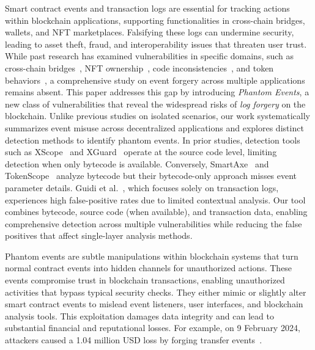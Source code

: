 Smart contract events and transaction logs are essential for tracking actions within blockchain applications, supporting functionalities in cross-chain bridges, wallets, and NFT marketplaces. Falsifying these logs can undermine security, leading to asset theft, fraud, and interoperability issues that threaten user trust. While past research has examined vulnerabilities in specific domains, such as cross-chain bridges~\cite{Xscope,liao2024smartaxe,wang2024xguard}, NFT ownership~\cite{sleepminting}, code inconsistencies~\cite{doccon}, and token behaviors~\cite{TokenScope}, a comprehensive study on event forgery across multiple applications remains absent. This paper addresses this gap by introducing \emph{Phantom Events}, a new class of vulnerabilities that reveal the widespread risks of \emph{log forgery} on the blockchain. Unlike previous studies on isolated scenarios, our work systematically summarizes event misuse across decentralized applications and explores distinct detection methods to identify phantom events. In prior studies, detection tools such as XScope~\cite{Xscope} and XGuard~\cite{wang2024xguard} operate at the source code level, limiting detection when only bytecode is available. Conversely, SmartAxe~\cite{liao2024smartaxe} and TokenScope~\cite{TokenScope} analyze bytecode but their bytecode-only approach misses event parameter details. Guidi et al.~\cite{sleepminting}, which focuses solely on transaction logs, experiences high false-positive rates due to limited contextual analysis. Our tool combines bytecode, source code (when available), and transaction data, enabling comprehensive detection across multiple vulnerabilities while reducing the false positives that affect single-layer analysis methods.

Phantom events are subtle manipulations within blockchain systems that turn normal contract events
into hidden channels for unauthorized actions. These events compromise trust in blockchain
transactions, enabling unauthorized activities that bypass typical security checks. They either
mimic or slightly alter smart contract events to mislead event listeners, user interfaces, and
blockchain analysis tools. This exploitation damages data integrity and can lead to substantial
financial and reputational losses.
For example, on 9 February 2024, attackers caused a 1.04 million USD loss by forging transfer
events~\cite{zero_transfer}.

